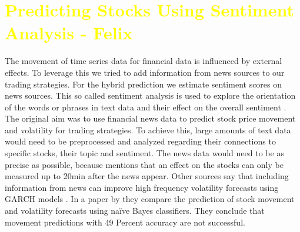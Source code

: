 \chapter{\textcolor{yellow}{Predicting Stocks Using Sentiment Analysis - Felix}} \label{ch:predictions_ml}

The movement of time series data for financial data is influenced by external effects. To leverage this we tried to add information from news sources to our trading strategies. For the hybrid prediction we estimate sentiment scores on news sources. This so called sentiment analysis is used to explore the orientation of the words or phrases in text data and their effect on the overall sentiment \citep{HADDI201326}. The original aim was to use financial news data to predict stock price movement and volatility for trading strategies. To achieve this, large amounts of text data would need to be preprocessed and analyzed regarding their connections to specific stocks, their topic and sentiment. The news data would need to be as precise as possible, because \citet{gidofalvi2001using} mentions that an effect on the stocks can only be measured up to 20min after the news appear. Other sources say that including information from news can improve high frequency volatility forecasts using GARCH models \citep{robertson2007news}. In a paper by \citet{atkins2018financial} they compare the prediction of stock movement and volatility forecasts using naïve Bayes classifiers. They conclude that movement predictions with 49 Percent accuracy are not successful. 

